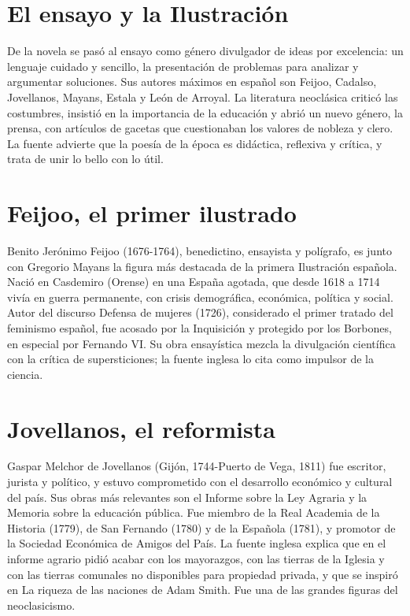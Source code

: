 \documentclass{book}
\begin{document}

\section{El ensayo y la Ilustración}

De la novela se pasó al ensayo como género divulgador de ideas por excelencia: un lenguaje cuidado y sencillo, la presentación de problemas para analizar y argumentar soluciones. Sus autores máximos en español son Feijoo, Cadalso, Jovellanos, Mayans, Estala y León de Arroyal. La literatura neoclásica criticó las costumbres, insistió en la importancia de la educación y abrió un nuevo género, la prensa, con artículos de gacetas que cuestionaban los valores de nobleza y clero. La fuente advierte que la poesía de la época es didáctica, reflexiva y crítica, y trata de unir lo bello con lo útil.


\section{Feijoo, el primer ilustrado}

Benito Jerónimo Feijoo (1676-1764), benedictino, ensayista y polígrafo, es junto con Gregorio Mayans la figura más destacada de la primera Ilustración española. Nació en Casdemiro (Orense) en una España agotada, que desde 1618 a 1714 vivía en guerra permanente, con crisis demográfica, económica, política y social. Autor del discurso Defensa de mujeres (1726), considerado el primer tratado del feminismo español, fue acosado por la Inquisición y protegido por los Borbones, en especial por Fernando VI. Su obra ensayística mezcla la divulgación científica con la crítica de supersticiones; la fuente inglesa lo cita como impulsor de la ciencia.


\section{Jovellanos, el reformista}

Gaspar Melchor de Jovellanos (Gijón, 1744-Puerto de Vega, 1811) fue escritor, jurista y político, y estuvo comprometido con el desarrollo económico y cultural del país. Sus obras más relevantes son el Informe sobre la Ley Agraria y la Memoria sobre la educación pública. Fue miembro de la Real Academia de la Historia (1779), de San Fernando (1780) y de la Española (1781), y promotor de la Sociedad Económica de Amigos del País. La fuente inglesa explica que en el informe agrario pidió acabar con los mayorazgos, con las tierras de la Iglesia y con las tierras comunales no disponibles para propiedad privada, y que se inspiró en La riqueza de las naciones de Adam Smith. Fue una de las grandes figuras del neoclasicismo.
\end{document}

